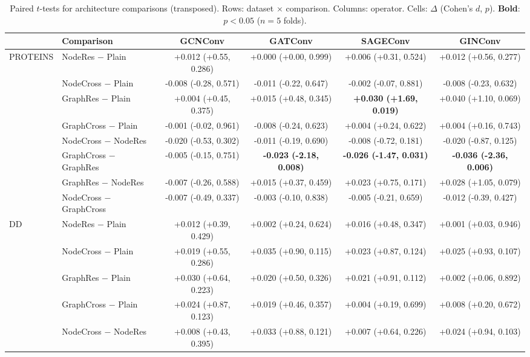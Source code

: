 \begin{table}[t]
\centering
\scriptsize
\setlength{\tabcolsep}{2.8pt}
\caption{Paired $t$-tests for architecture comparisons (transposed). Rows: dataset $\times$ comparison. Columns: operator. Cells: $\Delta$ (Cohen's $d$, $p$). \textbf{Bold}: $p<0.05$ ($n{=}5$ folds).}
\label{tab:statistical_tests}
\begin{tabular}{llcccc}}
\toprule
Dataset & Comparison & GCNConv & GATConv & SAGEConv & GINConv \\
\midrule
PROTEINS & NodeRes $-$ Plain & +0.012 (+0.55, 0.286) & +0.000 (+0.00, 0.999) & +0.006 (+0.31, 0.524) & +0.012 (+0.56, 0.277) \\
 & NodeCross $-$ Plain & -0.008 (-0.28, 0.571) & -0.011 (-0.22, 0.647) & -0.002 (-0.07, 0.881) & -0.008 (-0.23, 0.632) \\
 & GraphRes $-$ Plain & +0.004 (+0.45, 0.375) & +0.015 (+0.48, 0.345) & \textbf{+0.030 (+1.69, 0.019)} & +0.040 (+1.10, 0.069) \\
 & GraphCross $-$ Plain & -0.001 (-0.02, 0.961) & -0.008 (-0.24, 0.623) & +0.004 (+0.24, 0.622) & +0.004 (+0.16, 0.743) \\
 & NodeCross $-$ NodeRes & -0.020 (-0.53, 0.302) & -0.011 (-0.19, 0.690) & -0.008 (-0.72, 0.181) & -0.020 (-0.87, 0.125) \\
 & GraphCross $-$ GraphRes & -0.005 (-0.15, 0.751) & \textbf{-0.023 (-2.18, 0.008)} & \textbf{-0.026 (-1.47, 0.031)} & \textbf{-0.036 (-2.36, 0.006)} \\
 & GraphRes $-$ NodeRes & -0.007 (-0.26, 0.588) & +0.015 (+0.37, 0.459) & +0.023 (+0.75, 0.171) & +0.028 (+1.05, 0.079) \\
 & NodeCross $-$ GraphCross & -0.007 (-0.49, 0.337) & -0.003 (-0.10, 0.838) & -0.005 (-0.21, 0.659) & -0.012 (-0.39, 0.427) \\
\midrule
DD & NodeRes $-$ Plain & +0.012 (+0.39, 0.429) & +0.002 (+0.24, 0.624) & +0.016 (+0.48, 0.347) & +0.001 (+0.03, 0.946) \\
 & NodeCross $-$ Plain & +0.019 (+0.55, 0.286) & +0.035 (+0.90, 0.115) & +0.023 (+0.87, 0.124) & +0.025 (+0.93, 0.107) \\
 & GraphRes $-$ Plain & +0.030 (+0.64, 0.223) & +0.020 (+0.50, 0.326) & +0.021 (+0.91, 0.112) & +0.002 (+0.06, 0.892) \\
 & GraphCross $-$ Plain & +0.024 (+0.87, 0.123) & +0.019 (+0.46, 0.357) & +0.004 (+0.19, 0.699) & +0.008 (+0.20, 0.672) \\
 & NodeCross $-$ NodeRes & +0.008 (+0.43, 0.395) & +0.033 (+0.88, 0.121) & +0.007 (+0.64, 0.226) & +0.024 (+0.94, 0.103) \\

\end{tabular}
\end{table}

